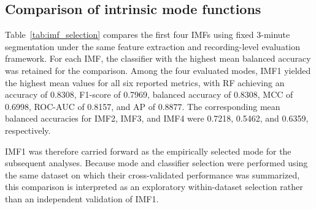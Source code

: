 \documentclass[10pt,letterpaper]{article}
\begin{document}
\subsection*{Comparison of intrinsic mode functions}

Table~\ref{tab:imf_selection} compares the first four IMFs using fixed 3-minute segmentation under the same feature extraction and recording-level evaluation framework. For each IMF, the classifier with the highest mean balanced accuracy was retained for the comparison. Among the four evaluated modes, IMF1 yielded the highest mean values for all six reported metrics, with RF achieving an accuracy of 0.8308, F1-score of 0.7969, balanced accuracy of 0.8308, MCC of 0.6998, ROC-AUC of 0.8157, and AP of 0.8877. The corresponding mean balanced accuracies for IMF2, IMF3, and IMF4 were 0.7218, 0.5462, and 0.6359, respectively.

IMF1 was therefore carried forward as the empirically selected mode for the subsequent analyses. Because mode and classifier selection were performed using the same dataset on which their cross-validated performance was summarized, this comparison is interpreted as an exploratory within-dataset selection rather than an independent validation of IMF1.

\begin{table}[!htbp]
\centering
\caption{\textbf{Recording-level comparison of the first four IMFs using fixed 3-minute segmentation.} For each IMF, the classifier with the highest mean balanced accuracy was retained. Values are means across 30 complete repetition-level out-of-fold evaluations. Preterm delivery was treated as the positive class.}
\label{tab:imf_selection}
\end{table}
\FloatBarrier
\end{document}
